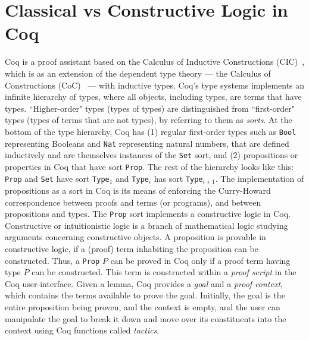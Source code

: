 \documentclass[11pt]{article}
\begin{document}
	\section{Classical vs Constructive Logic in Coq}
	\label{sec:logic}
	Coq is a proof assistant based on the 
	Calculus of Inductive Constructions 
	(CIC)~\cite{paulinmohring:hal-01094195},
	which is as an extension of the dependent 
	type theory --- the Calculus of Constructions 
	(CoC)~\cite{10.1016/0890-5401(88)90005-3} 
	--- with inductive types. Coq's type 
	systems implements an infinite hierarchy
	of types, where all objects, including 
	types, are terms that have types. 
	``Higher-order" types (types of types) are 
	distinguished from ``first-order" types 
	(types of terms that are not types), 
	by referring to 
	them as \textit{sorts}. At the bottom of the 
	type hierarchy, Coq has (1) regular first-order
	types such as \texttt{Bool} representing 
	Booleans and \texttt{Nat} representing 
	natural numbers, that are defined inductively
	and are themselves instances of the 
	\texttt{Set} sort, and (2) propositions or 
	properties in Coq that have sort 
	\texttt{Prop}. The rest of the 
	hierarchy looks like this: 
	\texttt{Prop} and 
	\texttt{Set} have sort 
	\texttt{Type$_1$} and 
	\texttt{Type$_i$} has sort 
	\texttt{Type$_{i+1}$}. The implementation 
	of propositions as a sort in Coq is its
	means of enforcing the Curry-Howard 
	correspondence between proofs and 
	terms (or programs), and between 
	propositions and types. The \texttt{Prop} 
	sort implements a constructive logic in 
	Coq. Constructive or intuitionistic logic 
	is a branch of mathematical logic 
	studying arguments concerning 
	constructive objects. A proposition 
	is provable in constructive logic, if 
	a (proof) term inhabiting the 
	proposition can be constructed.
	Thus, a \texttt{Prop} $P$ can be proved 
	in Coq only if a proof term having 
	type $P$ can be constructed. 	
	This term is constructed within 
	a \textit{proof script} in the Coq
	user-interface. Given a lemma, Coq 
	provides a \textit{goal} and 
	a \textit{proof context}, which 
	contains the 
	terms available to prove the goal.
	Initially, the goal is the entire 
	proposition being proven, and the 
	context is empty, and the user
	can manipulate the goal to break 
	it down and move over its 
	constituents into the context
	using Coq functions called 
	\textit{tactics}.
	
\end{document}
